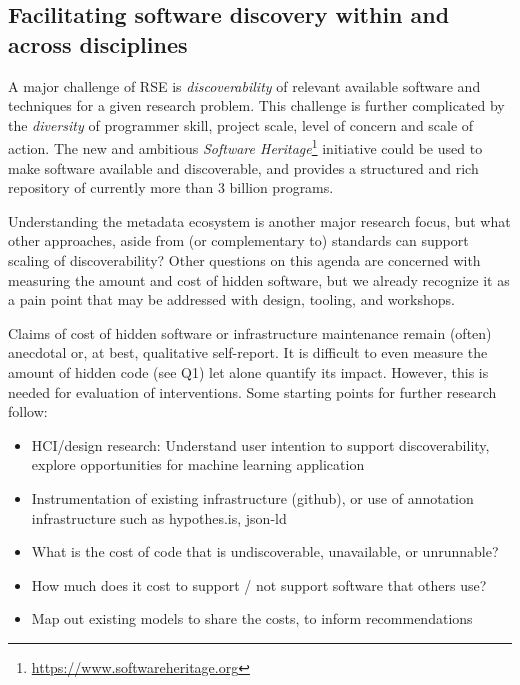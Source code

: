 \documentclass[a4paper,UKenglish]{dagman}
\begin{document}
\subsection{Facilitating software discovery within and across disciplines}

A major challenge of RSE is \emph{discoverability} of relevant available software and techniques for
a given research problem. This challenge is further complicated by the \emph{diversity} of
programmer skill, project scale, level of concern and scale of action. The new and ambitious
\textit{Software Heritage}\footnote{\url{https://www.softwareheritage.org}} initiative could be used
to make software available and discoverable, and provides a structured and rich repository of
currently more than 3 billion programs.

Understanding the metadata ecosystem is another major research focus, but what other approaches, aside from (or complementary to) standards can support scaling of discoverability? Other questions on this agenda are concerned with measuring the amount and cost of hidden software, but we already recognize it as a pain point that may be addressed with design, tooling, and workshops.


Claims of cost of hidden software or infrastructure maintenance remain (often) anecdotal or, at best, qualitative self-report. It is difficult to even measure the amount of hidden code (see Q1) let alone quantify its impact. However, this is needed for evaluation of interventions.
Some starting points for further research follow:

\begin{itemize}
\item HCI/design research: Understand user intention to support discoverability, explore opportunities for machine learning application
\item Instrumentation of existing infrastructure (github), or use of annotation infrastructure such as hypothes.is, json-ld
\item What is the cost of code that is undiscoverable, unavailable, or unrunnable?
\item How much does it cost to support / not support software that others use?
\item Map out existing models to share the costs, to inform recommendations
\end{itemize}
\end{document}
